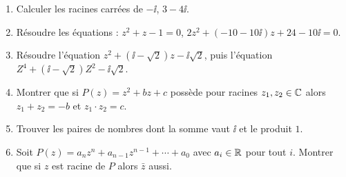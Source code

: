 \begin{frame}
\begin{miniexercice}
\begin{enumerate}
  \item Calculer les racines carrées de $-\ii$, $3-4\ii$. 
  \item Résoudre les équations : $z^2+z-1=0$, $2z^2 + (-10-10\ii)z+24-10\ii = 0$.
  \item Résoudre l'équation $z^2+(\ii-\sqrt 2)z-\ii\sqrt 2$, puis l'équation $Z^4+(\ii-\sqrt 2)Z^2-\ii\sqrt 2$.
  \item Montrer que si $P(z)=z^2+bz+c$ possède pour racines $z_1, z_2 \in \mathbb{C}$ alors 
$z_1+z_2=-b$ et $z_1 \cdot z_2 = c$.
  \item Trouver les paires de nombres dont la somme vaut $\ii$ et le produit $1$.
  \item Soit $P (z) = a_n z^n + a_{n - 1} z^{n - 1} + \cdots  + a_0$ avec $a_i \in \mathbb{R}$ pour tout $i$.
Montrer que si $z$ est racine de $P$ alors $\bar z$ aussi.
\end{enumerate}
\end{miniexercice}
\end{frame}



